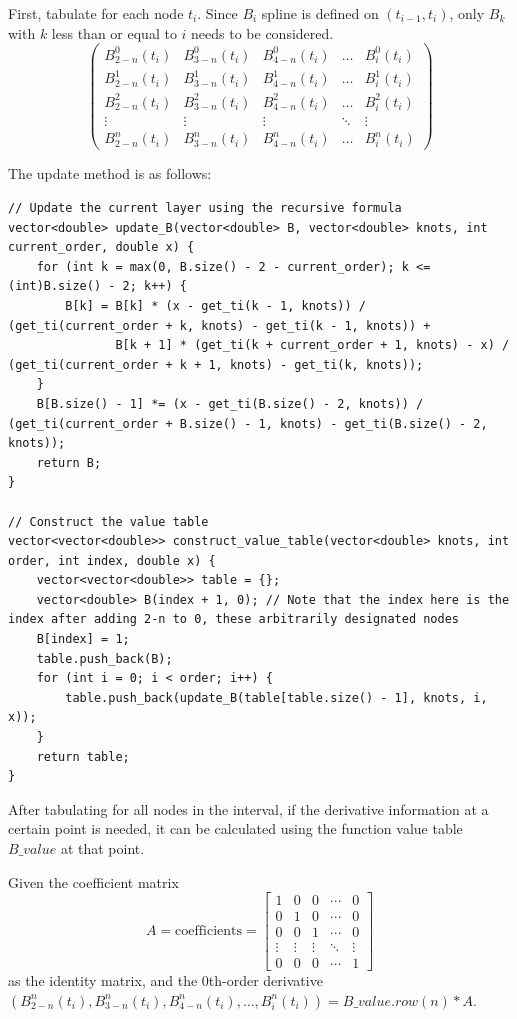 \documentclass[a4paper]{article}
\begin{document}
First, tabulate for each node $t_i$. Since $B_i$ spline is defined on $(t_{i-1},t_i)$, only $B_k$ with $k$ less than or equal to $i$ needs to be considered.
\[
\begin{pmatrix}
B^0_{2-n}(t_i) & B^0_{3-n}(t_i) & B^0_{4-n}(t_i) & \dots & B^0_{i}(t_i) \\
B^1_{2-n}(t_i) & B^1_{3-n}(t_i) & B^1_{4-n}(t_i) & \dots & B^1_{i}(t_i) \\
B^2_{2-n}(t_i) & B^2_{3-n}(t_i) & B^2_{4-n}(t_i) & \dots & B^2_{i}(t_i) \\
\vdots & \vdots & \vdots & \ddots & \vdots \\
B^n_{2-n}(t_i) & B^n_{3-n}(t_i) & B^n_{4-n}(t_i) & \dots & B^n_{i}(t_i)
\end{pmatrix}
\]

The update method is as follows:
\begin{verbatim}
// Update the current layer using the recursive formula
vector<double> update_B(vector<double> B, vector<double> knots, int current_order, double x) {
    for (int k = max(0, B.size() - 2 - current_order); k <= (int)B.size() - 2; k++) {
        B[k] = B[k] * (x - get_ti(k - 1, knots)) / (get_ti(current_order + k, knots) - get_ti(k - 1, knots)) +
               B[k + 1] * (get_ti(k + current_order + 1, knots) - x) / (get_ti(current_order + k + 1, knots) - get_ti(k, knots));
    }
    B[B.size() - 1] *= (x - get_ti(B.size() - 2, knots)) / (get_ti(current_order + B.size() - 1, knots) - get_ti(B.size() - 2, knots));
    return B;
}

// Construct the value table
vector<vector<double>> construct_value_table(vector<double> knots, int order, int index, double x) {
    vector<vector<double>> table = {};
    vector<double> B(index + 1, 0); // Note that the index here is the index after adding 2-n to 0, these arbitrarily designated nodes
    B[index] = 1;
    table.push_back(B);
    for (int i = 0; i < order; i++) {
        table.push_back(update_B(table[table.size() - 1], knots, i, x));
    }
    return table;
}
\end{verbatim}

After tabulating for all nodes in the interval, if the derivative information at a certain point is needed, it can be calculated using the function value table $B\_value$ at that point.

Given the coefficient matrix
\[ A = \text{coefficients} = \begin{bmatrix}
1 & 0 & 0 & \cdots & 0 \\
0 & 1 & 0 & \cdots & 0 \\
0 & 0 & 1 & \cdots & 0 \\
\vdots & \vdots & \vdots & \ddots & \vdots \\
0 & 0 & 0 & \cdots & 1
\end{bmatrix} \]
as the identity matrix, and the 0th-order derivative $(B^n_{2-n}(t_i) , B^n_{3-n}(t_i) , B^n_{4-n}(t_i) , \dots , B^n_{i}(t_i)) = B\_value.row(n) * A$.
\end{document}
